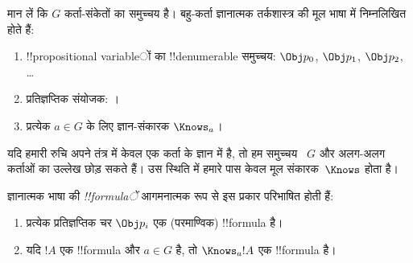 \documentclass[../../../include/open-logic-section]{subfiles}
\begin{document}


\begin{defn}
मान लें कि $G$ कर्ता-संकेतों का समुच्चय है। बहु-कर्ता ज्ञानात्मक तर्कशास्त्र
की मूल भाषा में निम्नलिखित होते हैं:
\begin{enumerate}
  \item !!{propositional variable}ों का !!{denumerable} समुच्चय: $\Obj
    p_0$, $\Obj p_1$, $\Obj p_2$, \dots
  \item प्रतिज्ञप्तिक संयोजक: \startycommalist
  ।
  \item प्रत्येक $a \in G$ के लिए ज्ञान-संकारक $\Knows_a$।
\end{enumerate}
\end{defn}

यदि हमारी रुचि अपने तंत्र में केवल एक कर्ता के ज्ञान में है, तो हम समुच्चय
~$G$ और अलग-अलग कर्ताओं का उल्लेख छोड़ सकते हैं। उस स्थिति में हमारे पास
केवल मूल संकारक~$\Knows$ होता है।

\begin{defn}
ज्ञानात्मक भाषा की \emph{!!{formula}ें} आगमनात्मक रूप से इस प्रकार परिभाषित
होती हैं:
\begin{enumerate}


\item प्रत्येक प्रतिज्ञप्तिक चर $\Obj p_i$ एक (परमाण्विक) !!{formula} है।






\item यदि $!A$ एक !!{formula} और $a \in G$ है, तो $\Knows_a !A$ एक
  !!{formula} है।

\end{enumerate}
\end{defn}
\end{document}
